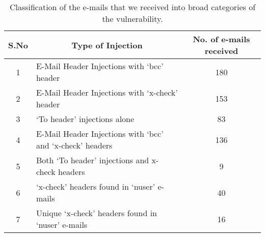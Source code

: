 \begin{table}[!htbp]
	\centering
	\begin{tabular}{|c|l|c|}
		\hline
		\multicolumn{1}{|c|}{\textbf{S.No}} &
		\multicolumn{1}{c|}{\textbf{Type of Injection}} &
		\multicolumn{1}{p{3cm}|}{\centering \textbf{No. of e-mails received}}\\
		\hline
		1 & E-Mail Header Injections with `bcc' header & 180\\
		\hline
		2 & E-Mail Header Injections with `x-check' header & 153\\
		\hline
		3 & `To header' injections alone & 83\\
		\hline
		4 & E-Mail Header Injections with `bcc' and `x-check' headers & 136\\
		\hline
		5 & Both `To header' injections and x-check headers & 9\\
		\hline
		6 & `x-check' headers found in `nuser' e-mails & 40\\
		\hline
		7 & Unique `x-check' headers found in `nuser' e-mails & 16\\
		\hline
	\end{tabular}
	\caption[]{Classification of the e-mails that we received into broad categories of the vulnerability.}
	\label{tab:analysis}
\end{table}